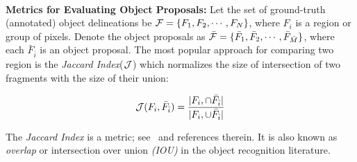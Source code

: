 
\noindent\\
{\bf Metrics for Evaluating Object Proposals: } Let the set of ground-truth (annotated) object delineations be  ${\cal F}=\{F_1, F_2, \cdots, F_N\}$, where $F_i$ is a region or group of pixels. Denote the object proposals as ${\cal \bar F}=\{\bar F_1, \bar F_2, \cdots, \bar F_{\bar M}\}$, where each $\bar F_{\bar i}$ is an object proposal. The most popular approach for comparing two region is the \emph{Jaccard Index}(${\cal J}$) which normalizes the size of intersection of two fragments with the size of their union:







\begin{equation}
\small
{\cal J}(F_i,\bar F_{\bar i}) = \frac{|F_i,\cap \bar F_{\bar i}|}{|F_i,\cup \bar F_{\bar i}|}
\label{eq:ji}
\end{equation}\noindent

\noindent
The \emph{Jaccard Index} is a metric; see~\cite{Kosub:ARXIV16} and references therein. It is also known as {\em overlap} or intersection over union {\em (IOU)} in the object recognition literature.





